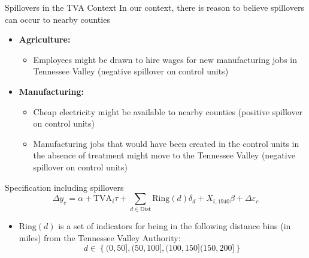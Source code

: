 \documentclass[aspectratio=169]{beamer}
\begin{document}
\begin{frame}{Spillovers in the TVA Context}
    In our context, there is reason to believe spillovers can occur to nearby counties

    \begin{itemize}
        \item \textbf{Agriculture:} 
        \begin{itemize}
            \item Employees might be drawn to hire wages for new manufacturing jobs in Tennessee Valley (negative spillover on control units)
        \end{itemize}
        
        \item \textbf{Manufacturing:}
        \begin{itemize}
            \item Cheap electricity might be available to nearby counties (positive spillover on control units) 
            
            \item Manufacturing jobs that would have been created in the control units in the absence of treatment might move to the Tennessee Valley (negative spillover on control units)
        \end{itemize}
    \end{itemize}
\end{frame}

\begin{frame}{Specification including spillovers}
    \begin{equation}
        \Delta y_c = \alpha + \text{TVA}_i \tau + \sum_{d \in \text{Dist}} \text{Ring}(d)\delta_d + X_{i, 1940} \beta + \Delta \varepsilon_c
    \end{equation} 

    \begin{itemize}
        \item $\text{Ring}(d)$ is a set of indicators for being in the following distance bins (in miles) from the Tennessee Valley Authority: 
        \[ d \in \left\{ (0, 50], (50, 100], (100, 150] (150, 200]\right\} \]
    \end{itemize}
\end{frame}

\end{document}
